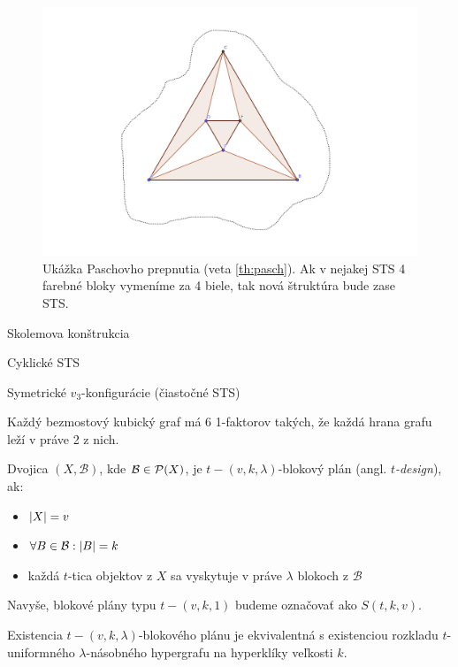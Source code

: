 \begin{figure}
    \centering
    \includegraphics[width=\textwidth]{pasch2.pdf}
    \caption{Ukážka Paschovho prepnutia (veta \ref{th:pasch}). Ak v nejakej STS 4 farebné bloky vymeníme za 4 biele, tak nová štruktúra bude zase STS.}
    \label{img:pasch}
\end{figure}



\TODO Skolemova konštrukcia

\TODO Cyklické STS

\TODO Symetrické $v_3$-konfigurácie (čiastočné STS)

\begin{hypothesis}
Každý bezmostový kubický graf má 6 1-faktorov takých, že každá hrana grafu leží v práve 2 z nich.
\end{hypothesis}


\begin{definition}
Dvojica $(X, \mathcal{B})$, kde $\mathcal{B} \in \mathcal{P}(X)$, je $t-(v, k, \lambda)$-blokový plán (angl. \emph{$t$-design}), ak:
\begin{itemize}
    \item $\left|X\right| = v$
    \item $\forall B \in \mathcal{B}: \left|B\right| = k$
    \item každá $t$-tica objektov z $X$ sa vyskytuje v práve $\lambda$ blokoch z $\mathcal{B}$
\end{itemize}

Navyše, blokové plány typu $t-(v,k,1)$ budeme označovať ako $S(t,k,v)$.
\end{definition}

\begin{remark}
Existencia $t-(v,k,\lambda)$-blokového plánu je ekvivalentná s existenciou rozkladu $t$-uniformného $\lambda$-násobného hypergrafu na hyperklíky veľkosti $k$.
\end{remark}

